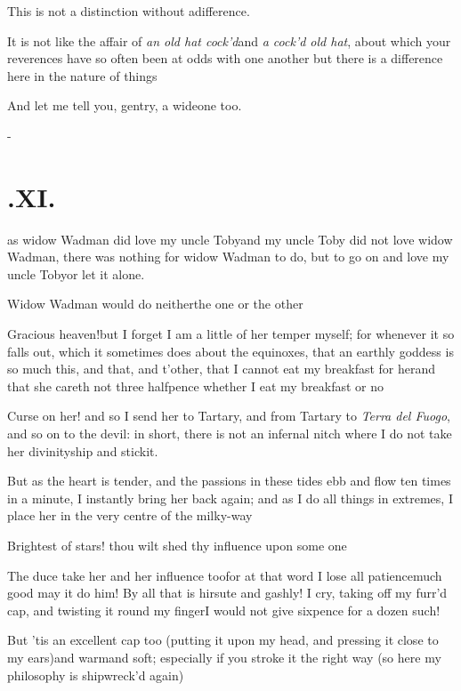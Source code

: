 \documentclass{article}
\begin{document}
This is not a distinction without a\break difference.

It is not like the affair of \textit{an old hat\break
cock’d}\tsk and \textit{a cock’d old hat}, about\break
which your reverences have so often\break
been at odds with one another \tsh but\break
there is a difference here in the nature of\break
things\tsh

And let me tell you, gentry, a wide\break one too.

\vfill{}\eject
\null\kern-\baselineskip
\section{.\enspace XI.}

 as widow Wadman did love
my uncle Toby\tsh and my uncle\break
Toby did not love widow Wadman,\break
there was nothing for widow Wadman\break
to do, but to go on and love my uncle\break
Toby\tsh or let it alone.

Widow Wadman would do neither\break the one or the other\tsh

\tsk Gracious heaven!\tsk but I forget I am a
little of her temper myself; for whenever it so falls out, which it
sometimes does about the equinoxes, that an earthly goddess is so
much this, and that, and t’other, that I cannot eat my
breakfast for her\tsh and that she careth not three
halfpence whether I eat my breakfast or no\tsh

\tsh Curse on her! and so I send her\break
to Tartary, and from Tartary to \textit{Terra\break
del Fuogo}, and so on to the devil: in\break
short, there is not an infernal nitch where\break
I do not take her divinityship and stick\break it.

But as the heart is tender, and the passions in these tides ebb
and flow ten times in a minute, I instantly bring her back again;
and as I do all things in extremes, I place her in the very
centre\break
of the milky-way\tsh

Brightest of stars! thou wilt shed thy influence upon some
one\tsh{}

\tsh The duce take her and her influence
too\tsh for at that word I lose all
patience\tsh much good may it do him! \tsh By all
that is hirsute and gashly!\break
I cry, taking off my furr’d cap, and\break
twisting it round my finger\tsh I would\break
not give sixpence for a dozen such!

\tsh But ’tis an excellent cap too (putting it upon my head, and
pressing it close to my ears)\tsk and warm\tsk and soft;
especially if you stroke it the right way\tsk\break
{}
(so here my philosophy is shipwreck’d again)
\end{document}
